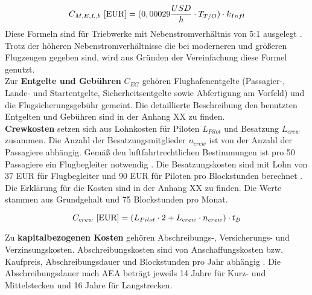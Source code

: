 \begin{equation}
   {C_{M,E,L,b} ~[\text{EUR}]} = (0,00029 \frac{USD}{h} \cdot T_{T/O} )\cdot k_{Infl}\\
   \label{maintenance engine}
\end{equation}
%
Diese Formeln sind für Triebwerke mit Nebenstromverhältnis von 5:1 ausgelegt \cite{bruge2018wartungskosten}. %
Trotz der höheren Nebenstromverhältnisse die bei moderneren und größeren Flugzeugen gegeben sind,
wird aus Gründen der Vereinfachung diese Formel genutzt.\\
%
%
%
Zur \textbf{Entgelte und Gebühren} $C_{EG}$ gehören Flughafenentgelte (Passagier-, Lande- und Startentgelte, Sicherheitsentgelte sowie Abfertigung am 
Vorfeld) und die Flugsicherungsgebühr gemeint. Die detaillierte Beschreibung den benutzten Entgelten und Gebühren sind in der Anhang XX zu finden.\\

\textbf{Crewkosten} setzen sich aus Lohnkosten für Piloten $L_{Pilot}$ und Besatzung $L_{crew}$ zusammen. 
Die Anzahl der Besatzungsmitglieder $n_{crew}$ ist von der Anzahl der Passagiere abhängig. 
Gemäß den luftfahrtrechtlichen Bestimmungen ist pro 50 Passagiere ein Flugbegleiter notwendig \cite{conrady2019luftverkehr}.
Die Besatzungskosten sind mit Lohn von 37 EUR für Flugbegleiter und 90 EUR für Piloten pro Blockstunden berechnet \cite{discover_airlines_cabin}.
Die Erklärung für die Kosten sind in der Anhang XX zu finden. Die Werte stammen aus Grundgehalt und 75 Blockstunden pro Monat.

\begin{equation}
   {C_{crew} ~[\text{EUR}]} = ({L}_{Pilot} \cdot 2 + {L}_{crew} \cdot n_{crew} ) \cdot t_{B} \\
   \label{crew cost}
\end{equation}


Zu \textbf{kapitalbezogenen Kosten} gehören Abschreibungs-, Versicherungs- und Verzinsungskosten. 
Abschreibungskosten sind von Anschaffungskosten bzw. Kaufpreis, Abschreibungsdauer und Blockstunden pro Jahr abhängig \cite{conrady2019luftverkehr}.
Die Abschreibungsdauer nach AEA beträgt jeweils 14 Jahre für Kurz- und Mittelstecken und 16 Jahre für Langstrecken.

